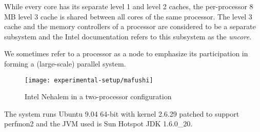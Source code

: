 While every core has its separate level 1 and level 2 caches, the
per-processor 8 MB level 3 cache is shared between all cores of the
same processor. The level 3 cache and the memory controllers of a
processor are considered to be a separate subsystem and the Intel
documentation refers to this subsystem as the \emph{uncore}.

We sometimes refer to a processor as a node to emphasize its
participation in forming a (large-scale) parallel system.

\begin{figure}[htb]
  \centering
  \texttt{[image: experimental-setup/mafushi]}
  \caption{Intel Nehalem in a two-processor configuration}
  \label{fig:experimental-setup-mafushi}
\end{figure}

The system runs Ubuntu 9.04 64-bit with kernel 2.6.29 patched to
support perfmon2 \cite{Eranian2008} and the JVM used is Sun Hotspot
JDK 1.6.0\_20.


